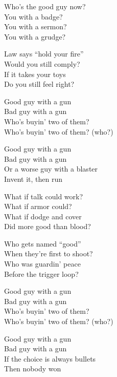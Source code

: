 \begin{lyrics}
Who’s the good guy now?\\
You with a badge?\\
You with a sermon?\\
You with a grudge?

Law says “hold your fire”\\
Would you still comply?\\
If it takes your toys\\
Do you still feel right?

Good guy with a gun\\
Bad guy with a gun\\
Who’s buyin’ two of them?\\
Who’s buyin’ two of them? (who?)

Good guy with a gun\\
Bad guy with a gun\\
Or a worse guy with a blaster\\
Invent it, then run

What if talk could work?\\
What if armor could?\\
What if dodge and cover\\
Did more good than blood?

Who gets named “good”\\
When they’re first to shoot?\\
Who was guardin’ peace\\
Before the trigger loop?

Good guy with a gun\\
Bad guy with a gun\\
Who’s buyin’ two of them?\\
Who’s buyin’ two of them? (who?)

Good guy with a gun\\
Bad guy with a gun\\
If the choice is always bullets\\
Then nobody won
\end{lyrics}

